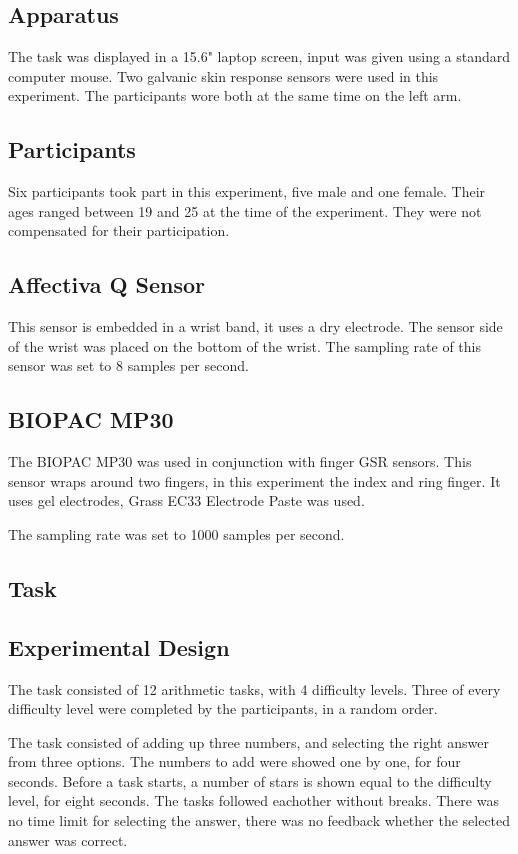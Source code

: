 \documentclass[12pt,leqno,letterpaper]{report} %
\begin{document}
\subsection{Apparatus}
The task was displayed in a 15.6" laptop screen, input was given using a standard computer mouse.
Two galvanic skin response sensors were used in this experiment. The participants wore both at the same time on the left arm.

\subsection{Participants}
Six participants took part in this experiment, five male and one female. Their ages ranged between 19 and 25 at the time of the experiment. They were not compensated for their participation.


\subsection{Affectiva Q Sensor}
This sensor is embedded in a wrist band, it uses a dry electrode. The sensor side of the wrist was placed on the bottom of the wrist. The sampling rate of this sensor was set to 8 samples per second.

\subsection{BIOPAC MP30}
The BIOPAC MP30 was used in conjunction with finger GSR sensors. This sensor wraps around two fingers, in this experiment the index and ring finger. It uses gel electrodes, Grass EC33 Electrode Paste was used.

The sampling rate was set to 1000 samples per second.

\subsection{Task}

\subsection{Experimental Design}
The task consisted of 12 arithmetic tasks, with 4 difficulty levels. Three of every difficulty level were completed by the participants, in a random order. 

The task consisted of adding up three numbers, and selecting the right answer from three options. The numbers to add were showed one by one, for four seconds. Before a task starts, a number of stars is shown equal to the difficulty level, for eight seconds. The tasks followed eachother without breaks. There was no time limit for selecting the answer, there was no feedback whether the selected answer was correct.
\end{document}
